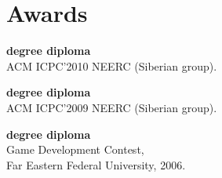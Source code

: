 \documentclass[a4paper]{article}
\begin{document}
	\section{Awards}
	\begin{items}
		\begin{multicols}{2}
			\raggedcolumns
			\item \textbf{ degree diploma}\\ACM ICPC'2010 NEERC (Siberian group).
			\item \textbf{ degree diploma}\\ACM ICPC'2009 NEERC (Siberian group).
			\columnbreak
			\item \textbf{ degree diploma}\\Game Development Contest,\\Far Eastern Federal University, 2006.
		\end{multicols}
	\end{items}
\end{document}
